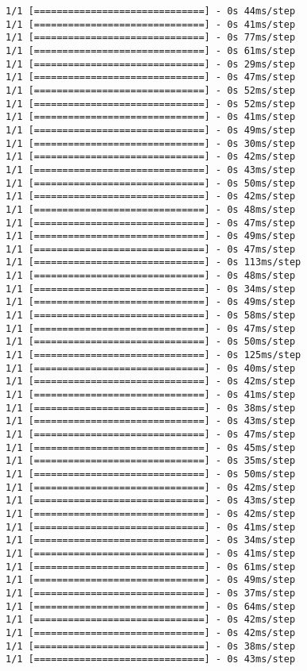 \documentclass[11pt]{article}
\begin{document}
\begin{Verbatim}[commandchars=\\\{\}]
1/1 [==============================] - 0s 44ms/step
1/1 [==============================] - 0s 41ms/step
1/1 [==============================] - 0s 77ms/step
1/1 [==============================] - 0s 61ms/step
1/1 [==============================] - 0s 29ms/step
1/1 [==============================] - 0s 47ms/step
1/1 [==============================] - 0s 52ms/step
1/1 [==============================] - 0s 52ms/step
1/1 [==============================] - 0s 41ms/step
1/1 [==============================] - 0s 49ms/step
1/1 [==============================] - 0s 30ms/step
1/1 [==============================] - 0s 42ms/step
1/1 [==============================] - 0s 43ms/step
1/1 [==============================] - 0s 50ms/step
1/1 [==============================] - 0s 42ms/step
1/1 [==============================] - 0s 48ms/step
1/1 [==============================] - 0s 47ms/step
1/1 [==============================] - 0s 49ms/step
1/1 [==============================] - 0s 47ms/step
1/1 [==============================] - 0s 113ms/step
1/1 [==============================] - 0s 48ms/step
1/1 [==============================] - 0s 34ms/step
1/1 [==============================] - 0s 49ms/step
1/1 [==============================] - 0s 58ms/step
1/1 [==============================] - 0s 47ms/step
1/1 [==============================] - 0s 50ms/step
1/1 [==============================] - 0s 125ms/step
1/1 [==============================] - 0s 40ms/step
1/1 [==============================] - 0s 42ms/step
1/1 [==============================] - 0s 41ms/step
1/1 [==============================] - 0s 38ms/step
1/1 [==============================] - 0s 43ms/step
1/1 [==============================] - 0s 47ms/step
1/1 [==============================] - 0s 45ms/step
1/1 [==============================] - 0s 35ms/step
1/1 [==============================] - 0s 50ms/step
1/1 [==============================] - 0s 42ms/step
1/1 [==============================] - 0s 43ms/step
1/1 [==============================] - 0s 42ms/step
1/1 [==============================] - 0s 41ms/step
1/1 [==============================] - 0s 34ms/step
1/1 [==============================] - 0s 41ms/step
1/1 [==============================] - 0s 61ms/step
1/1 [==============================] - 0s 49ms/step
1/1 [==============================] - 0s 37ms/step
1/1 [==============================] - 0s 64ms/step
1/1 [==============================] - 0s 42ms/step
1/1 [==============================] - 0s 42ms/step
1/1 [==============================] - 0s 38ms/step
1/1 [==============================] - 0s 43ms/step

\end{Verbatim}
\end{document}
